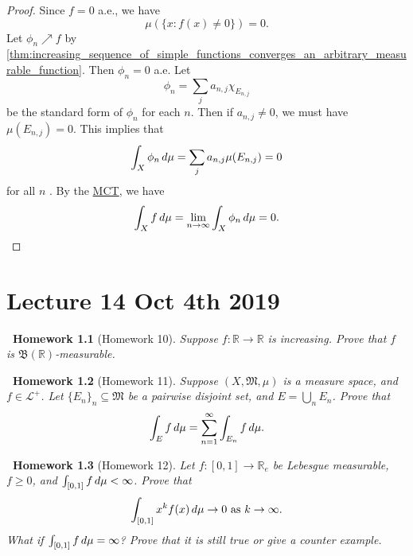 \documentclass[notoc,notitlepage]{tufte-book}
\newtheorem*{homework}{\faCogs\ Homework}
\begin{document}
\begin{proof}
  \noindent
  \hlbnoted{$(\impliedby)$}
  Since $f = 0$ a.e., we have
  \begin{equation*}
    \mu(\{x : f(x) \neq 0\}) = 0.
  \end{equation*}
  Let $\phi_n \nearrow f$ by
  \cref{thm:increasing_sequence_of_simple_functions_converges_an_arbitrary_measurable_function}.
  Then $\phi_n = 0$ a.e.
  Let
  \begin{equation*}
    \phi_n = \sum_{j} a_{n, j} \chi_{E_{n, j}}
  \end{equation*}
  be the standard form of $\phi_n$ for each $n$.
  Then if $a_{n, j} \neq 0$, we must have $\mu(E_{n, j}) = 0$.
  This implies that
  \begin{equation*}
    \int_{X} \phi_n \mathop{}\!d{\mu} = \sum_{j} a_{n, j} \mu(E_{n, j}) = 0
  \end{equation*}
  for all $n$ .
  By the \hyperref[thm:monotone_convergence_theorem]{MCT}, we have
  \begin{equation*}
    \int_{X} f \mathop{}\!d{\mu} = \lim_{n \to \infty} \int_{X} \phi_n \mathop{}\!d{\mu} = 0.
  \end{equation*}
\end{proof}



\chapter{Lecture 14 Oct 4th 2019}%
\label{chp:lecture_14_oct_4th_2019}

\begin{homework}[Homework 10]\label{homework:10}
	Suppose $f : \mathbb{R} \to \mathbb{R}$ is increasing.
  Prove that $f$ is $\mathfrak{B}(\mathbb{R})$-measurable.
\end{homework}

\begin{homework}[Homework 11]\label{homework:11}
  Suppose $(X, \mathfrak{M}, \mu)$ is a measure space,
  and $f \in \mathcal{L}^+$.
  Let $\{ E_n \}_n \subseteq \mathfrak{M}$ be a pairwise disjoint set,
  and $E = \bigcup_{n} E_n$.
  Prove that
  \begin{equation*}
    \int_{E} f \mathop{}\!d{\mu} = \sum_{n=1}^{\infty} \int_{E_n} f \mathop{}\!d{\mu}.
  \end{equation*}
\end{homework}

\begin{homework}[Homework 12]\label{homework:12}
  Let $f : [0, 1] \to \mathbb{R}_e$ be Lebesgue measurable,
  $f \geq 0$, and $\int_{[0, 1]} f \mathop{}\!d{\mu} < \infty$.
  Prove that
  \begin{equation*}
    \int_{[0, 1]} x^k f(x) \mathop{}\!d{\mu} \to 0 \text{ as } k \to \infty.
  \end{equation*}
  What if $\int_{[0, 1]} f \mathop{}\!d{\mu} = \infty$?
  Prove that it is still true or give a counter example.
\end{homework}
\end{document}
